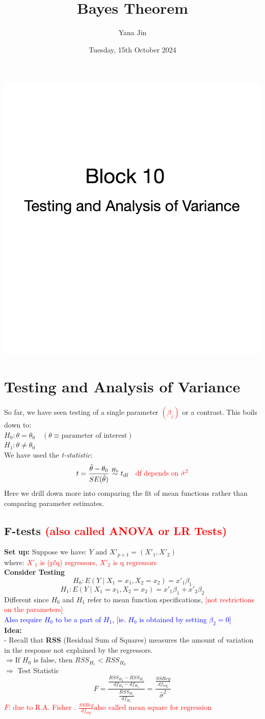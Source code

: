 \documentclass[14pt]{extarticle}
\title{Bayes Theorem}
\author{Yana Jin}
\date{Tuesday, 15th October 2024}
\newcommand{\coverpage}{%
    \begin{titlepage}
        \centering
        \includegraphics[width=1\textwidth]{cover.png}
    \end{titlepage}
}
\begin{document}
\coverpage

\section*{Testing and Analysis of Variance}

\noindent
So far, we have seen testing of a single parameter \textcolor{red}{$(\beta_j)$} or a contrast.
This boils down to:\\
$H_0: \theta = \theta_0 \quad (\theta \equiv \text{parameter of interest})$\\
$H_1: \theta \neq \theta_0$\\
We have used the \textit{t-statistic}:
\[
t = \frac{\hat{\theta} - \theta_0}{SE(\hat{\theta})} \overset{H_0}{\sim} t_{\text{df}}\quad \textcolor{red}{\text{df depends on } \hat{\sigma}^2}
\]
Here we drill down more into comparing the fit of mean functions rather than comparing parameter estimates.

\subsection*{F-tests \textcolor{red}{(also called ANOVA or LR Tests)}}

\textbf{Set up:}  
Suppose we have: $Y \text{ and } X'_{p+1} = \left( X'_1, X'_2 \right)$\\
where: \textcolor{red}{$X'_1$ is (p!q) regressors, $X'_2$ is q regressors}\\
\textbf{Consider Testing}
\[
H_0: E(Y \mid X_1 = x_1, X_2 = x_2) = x'_1 \beta_1
\]
\[
H_1: E(Y \mid X_1 = x_1, X_2 = x_2) = x'_1 \beta_1 + x'_2 \beta_2
\]
Different since $H_0$ and $H_1$ refer to mean function specifications, \textcolor{red}{[not restrictions on the parameters]}\\
\textcolor{blue}{Also require $H_0$ to be a part of $H_1$, [ie. $H_0$ is obtained by setting $\beta_2 = 0$]}\\
\textbf{Idea:}\\
 - Recall that \textbf{RSS} (Residual Sum of Squares) measures the amount of variation in the response not explained by the regressors.\\
$\Rightarrow \text{If } H_0 \text{ is false, then } RSS_{H_1} < RSS_{H_0}$\\
$\Rightarrow$ Test Statistic
\[
F = \frac{\frac{RSS_{H_0} - RSS_{H_1}}{df_{H_0} - df_{H_1}}}{\frac{RSS_{H_1}}{df_{H_1}}}
 = \frac{\frac{SSReg}{df_{\text{reg}}}}{\hat{\sigma}^2}
\]
\textcolor{red}{$F$: due to R.A. Fisher . $\frac{SSReg}{df_{\text{reg}}}\text{also called mean square for regression}$}\\
\end{document}
